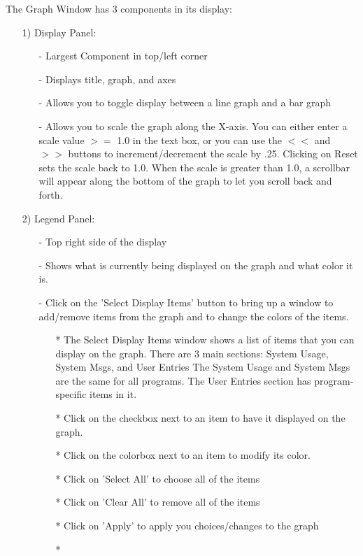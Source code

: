 \documentclass[10pt,dvips]{article}
\begin{document}
The Graph Window has 3 components in its display:
\begin{enumerate}
\item[1)]
Display Panel:
   \begin{itemize}
   \item[-]
   Largest Component in top/left corner
   \item[-]
   Displays title, graph, and axes
   \item[-]
   Allows you to toggle display between a line graph and a bar graph
   \item[-]
   Allows you to scale the graph along the X-axis.  You can either
   enter a scale value $>=$ 1.0 in the text box, or you can use the
   $<<$ and $>>$ buttons to increment/decrement the scale by .25.
   Clicking on Reset sets the scale back to 1.0.  When the scale is
   greater than 1.0, a scrollbar will appear along the bottom of the
   graph to let you scroll back and forth.
   \end{itemize}
\item[2)]
Legend Panel:
   \begin{itemize}
   \item[-]
   Top right side of the display
   \item[-]
   Shows what is currently being displayed on the graph and what color it
   is.
   \item[-]
   Click on the 'Select Display Items' button to bring up a window to
   add/remove items from the graph and to change the colors of the items.
      \begin{itemize}
      \item[*]
      The Select Display Items window shows a list of items that you
      can display on the graph.  There are 3 main sections: System
      Usage, System Msgs, and User Entries The System Usage and System
      Msgs are the same for all programs.  The User Entries section
      has program-specific items in it.
      \item[*]
      Click on the checkbox next to an item to have it displayed on the
      graph.
      \item[*]
      Click on the colorbox next to an item to modify its color.
      \item[*]
      Click on 'Select All' to choose all of the items
      \item[*]
      Click on 'Clear All' to remove all of the items
      \item[*]
      Click on 'Apply' to apply you choices/changes to the graph
      \item[*]

\end{itemize}
\end{itemize}
\end{enumerate}
\end{document}
